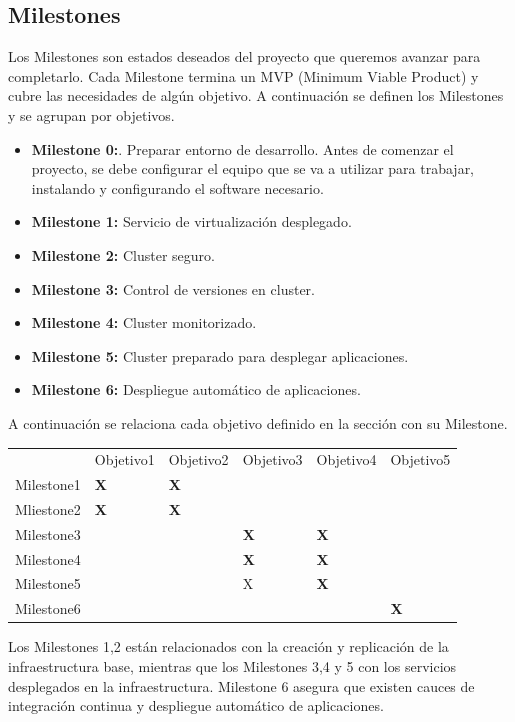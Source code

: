 \subsection{Milestones}
\label{Milestones}
\begin{text}
	Los Milestones son estados deseados del proyecto que queremos avanzar para completarlo. Cada Milestone termina un MVP (Minimum Viable Product) y cubre las necesidades de algún objetivo. A continuación se definen los Milestones y se agrupan por objetivos.
	
	\begin{itemize}
		\item \textbf{Milestone 0:}. Preparar entorno de desarrollo. Antes de comenzar el proyecto, se debe configurar el equipo que se va a utilizar para trabajar, instalando y configurando el software necesario. 
		\item \textbf{Milestone 1:} Servicio de virtualización desplegado. 
		\item \textbf{Milestone 2:} Cluster seguro.
		\item \textbf{Milestone 3:} Control de versiones en cluster.
		\item \textbf{Milestone 4:} Cluster monitorizado.
		\item \textbf{Milestone 5:} Cluster preparado para desplegar aplicaciones.
		\item \textbf{Milestone 6:} Despliegue automático de aplicaciones.
	\end{itemize}
	A continuación se relaciona cada objetivo definido en la sección  con su Milestone.
	
	
	\begin{table}[!hbt]
		\begin{tabular}{llllll}
			& Objetivo1         & Objetivo2         & Objetivo3         & Objetivo4         & Objetivo5         \\
			Milestone1 & \textbf{X} & \textbf{X} & \textbf{}  &            &            \\
			Mliestone2 & \textbf{X} & \textbf{X} &            &            &            \\
			Milestone3 &            &            & \textbf{X} & \textbf{X} &            \\
			Milestone4 &            &            & \textbf{X} & \textbf{X} &            \\
			Milestone5 &            &            & X          & \textbf{X} &            \\
			Milestone6 &            &            &            &            & \textbf{X}
		\end{tabular}
	\end{table}
	
	Los Milestones 1,2 están relacionados con la creación y replicación de la infraestructura base, mientras que los Milestones 3,4 y 5 con los servicios desplegados en la infraestructura. Milestone 6 asegura que existen cauces de integración continua y despliegue automático de aplicaciones.
	
\end{text}

